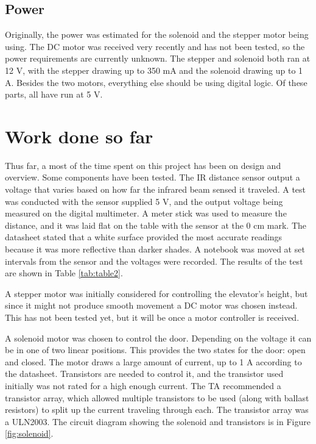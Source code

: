 \documentclass{article}
\begin{document}
	    \subsection{Power}
	    Originally, the power was estimated for the solenoid and the stepper motor being using. The DC motor was received very recently and has not been tested, so the power requirements are currently unknown. The stepper and solenoid both ran at 12 V, with the stepper drawing up to 350 mA and the solenoid drawing up to 1 A. Besides the two motors, everything else should be using digital logic. Of these parts, all have run at 5 V.

	\section{Work done so far}
	Thus far, a most of the time spent on this project has been on design and overview. Some components have been tested. The IR distance sensor output a voltage that varies based on how far the infrared beam sensed it traveled. A test was conducted with the sensor supplied 5 V, and the output voltage being measured on the digital multimeter. A meter stick was used to measure the distance, and it was laid flat on the table with the sensor at the 0 cm mark. The datasheet\cite{project_overview:IR_datasheet} stated that a white surface provided the most accurate readings because it was more reflective than darker shades. A notebook was moved at set intervals from the sensor and the voltages were recorded. The results of the test are shown in Table \ref{tab:table2}.
	
    A stepper motor was initially considered for controlling the elevator's height, but since it might not produce smooth movement a DC motor was chosen instead. This has not been tested yet, but it will be once a motor controller is received.
    
    A solenoid motor\cite{project_overview:solenoid_datasheet} was chosen to control the door. Depending on the voltage it can be in one of two linear positions. This provides the two states for the door: open and closed. The motor draws a large amount of current, up to 1 A according to the datasheet. Transistors are needed to control it, and the transistor used initially was not rated for a high enough current. The TA recommended a transistor array, which allowed multiple transistors to be used (along with ballast resistors) to split up the current traveling through each. The transistor array was a ULN2003\cite{project_overview:uln2003_datasheet}. The circuit diagram showing the solenoid and transistors is in Figure \ref{fig:solenoid}.
    
\end{document}
